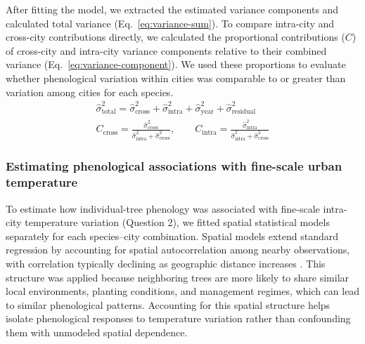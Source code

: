 After fitting the model, we extracted the estimated variance components and calculated total variance (Eq.~\ref{eq:variance-sum}). To compare intra-city and cross-city contributions directly, we calculated the proportional contributions ($C$) of cross-city and intra-city variance components relative to their combined variance (Eq.~\ref{eq:variance-component}). We used these proportions to evaluate whether phenological variation within cities was comparable to or greater than variation among cities for each species.
\begin{eqnarray}
\hat{\sigma}^2_{\mathrm{total}}
= \hat{\sigma}^2_{\mathrm{cross}}
+ \hat{\sigma}^2_{\mathrm{intra}}
+ \hat{\sigma}^2_{\mathrm{year}}
+ \hat{\sigma}^2_{\mathrm{residual}}
\label{eq:variance-sum} \\
C_{\mathrm{cross}}
= \frac{\hat{\sigma}^2_{\mathrm{cross}}}
{\hat{\sigma}^2_{\mathrm{intra}} + \hat{\sigma}^2_{\mathrm{cross}}},
\qquad
C_{\mathrm{intra}}
= \frac{\hat{\sigma}^2_{\mathrm{intra}}}
{\hat{\sigma}^2_{\mathrm{intra}} + \hat{\sigma}^2_{\mathrm{cross}}}
\label{eq:variance-component}
\end{eqnarray}

\subsubsection{Estimating phenological associations with fine-scale urban temperature}

To estimate how individual-tree phenology was associated with fine-scale intra-city temperature variation (Question 2), we fitted spatial statistical models separately for each species–city combination. Spatial models extend standard regression by accounting for spatial autocorrelation among nearby observations, with correlation typically declining as geographic distance increases \citep{banerjee_basics_2025, finley_spbayes_2007}. This structure was applied because neighboring trees are more likely to share similar local environments, planting conditions, and management regimes, which can lead to similar phenological patterns. Accounting for this spatial structure helps isolate phenological responses to temperature variation rather than confounding them with unmodeled spatial dependence.

